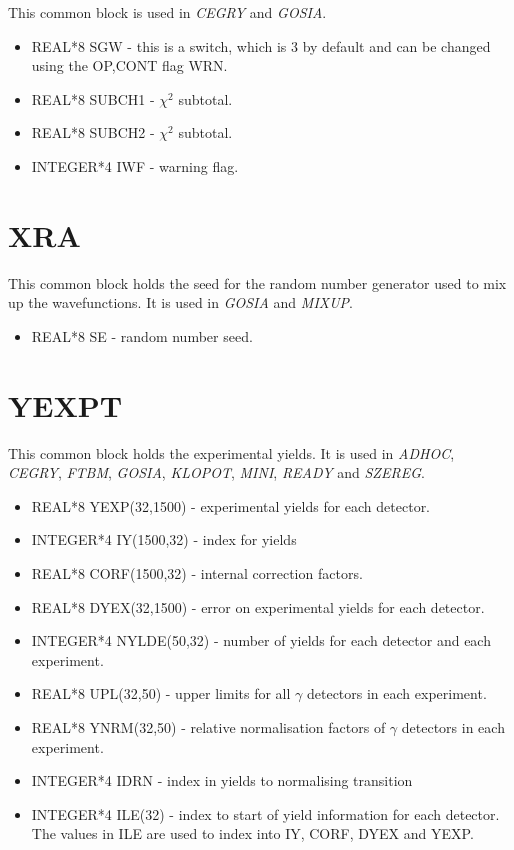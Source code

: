 This common block is used in {\em CEGRY} and {\em GOSIA}.

\begin{itemize}
\item REAL*8 SGW - this is a switch, which is 3 by default and can be
changed using the OP,CONT flag WRN.
\item REAL*8 SUBCH1 - $\chi^2$ subtotal.
\item REAL*8 SUBCH2 - $\chi^2$ subtotal.
\item INTEGER*4 IWF - warning flag.
\end{itemize}

\section{XRA}

This common block holds the seed for the random number generator used to mix
up the wavefunctions. It is used in {\em GOSIA} and {\em MIXUP}.

\begin{itemize}
\item REAL*8 SE - random number seed.
\end{itemize}

\section{YEXPT}

This common block holds the experimental yields. It is used in {\em ADHOC},
{\em CEGRY}, {\em FTBM}, {\em GOSIA}, {\em KLOPOT}, {\em MINI}, {\em READY}
and {\em SZEREG}.

\begin{itemize}
\item REAL*8 YEXP(32,1500) - experimental yields for each detector.
\item INTEGER*4 IY(1500,32) - index for yields
\item REAL*8 CORF(1500,32) - internal correction factors.
\item REAL*8 DYEX(32,1500) - error on experimental yields for each detector.
\item INTEGER*4 NYLDE(50,32) - number of yields for each detector and each
experiment.
\item REAL*8 UPL(32,50) - upper limits for all $\gamma$ detectors in each
experiment.
\item REAL*8 YNRM(32,50) - relative normalisation factors of $\gamma$
detectors in each experiment.
\item INTEGER*4 IDRN - index in yields to normalising transition
\item INTEGER*4 ILE(32) - index to start of yield information for each
detector. The values in ILE are used to index into IY, CORF, DYEX and YEXP.
\end{itemize}

